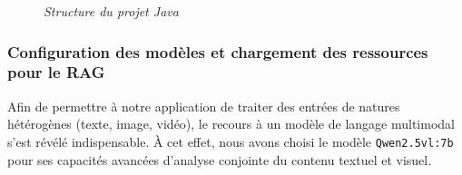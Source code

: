 \documentclass[12pt,a4paper]{report}
\begin{document}
	\begin{figure}[H]
		\centering
		\caption{\textit{Structure du projet Java}}
		\label{fig:structure-projet}
	\end{figure}
	
	\subsubsection{Configuration des modèles et chargement des ressources pour le RAG}
	
	Afin de permettre à notre application de traiter des entrées de natures hétérogènes (texte, image, vidéo), le recours à un modèle de langage multimodal s’est révélé indispensable. À cet effet, nous avons choisi le modèle \verb|Qwen2.5vl:7b| pour ses capacités avancées d’analyse conjointe du contenu textuel et visuel.
	
\end{document}
